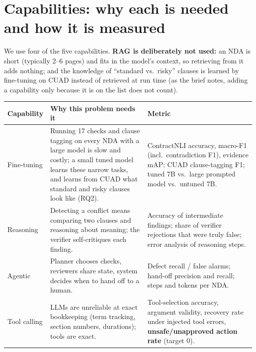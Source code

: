 \documentclass[11pt,a4paper]{article}
\begin{document}
\section{Capabilities: why each is needed and how it is measured}
We use four of the five capabilities. \textbf{RAG is deliberately not used:} an NDA is short (typically 2--6 pages) and
fits in the model's context, so retrieving from it adds nothing; and the knowledge of ``standard vs.\ risky'' clauses is
learned by fine-tuning on CUAD instead of retrieved at run time (as the brief notes, adding a capability only because it is
on the list does not count).
\begin{table}[H]
\small
\begin{tabularx}{\textwidth}{@{}p{2.1cm}LL@{}}
\toprule
\textbf{Capability} & \textbf{Why this problem needs it} & \textbf{Metric} \\
\midrule
Fine-tuning & Running 17 checks and clause tagging on every NDA with a large model is slow and costly; a small tuned model learns these narrow tasks, and learns from CUAD what standard and risky clauses look like (RQ2). & ContractNLI accuracy, macro-F1 (incl.\ contradiction F1), evidence mAP; CUAD clause-tagging F1; tuned 7B vs.\ large prompted model vs.\ untuned 7B. \\
Reasoning & Detecting a conflict means comparing two clauses and reasoning about meaning; the verifier self-critiques each finding. & Accuracy of intermediate findings; share of verifier rejections that were truly false; error analysis of reasoning steps. \\
Agentic & Planner chooses checks, reviewers share state, system decides when to hand off to a human. & Defect recall / false alarms; hand-off precision and recall; steps and tokens per NDA. \\
Tool calling & LLMs are unreliable at exact bookkeeping (term tracking, section numbers, durations); tools are exact. & Tool-selection accuracy, argument validity, recovery rate under injected tool errors, \textbf{unsafe/unapproved action rate} (target 0). \\
\bottomrule
\end{tabularx}
\end{table}

\end{document}
